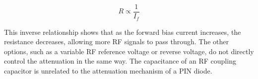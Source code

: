 \[
R \propto \frac{1}{I_f}
\]

This inverse relationship shows that as the forward bias current increases, the resistance decreases, allowing more RF signals to pass through. The other options, such as a variable RF reference voltage or reverse voltage, do not directly control the attenuation in the same way. The capacitance of an RF coupling capacitor is unrelated to the attenuation mechanism of a PIN diode.


